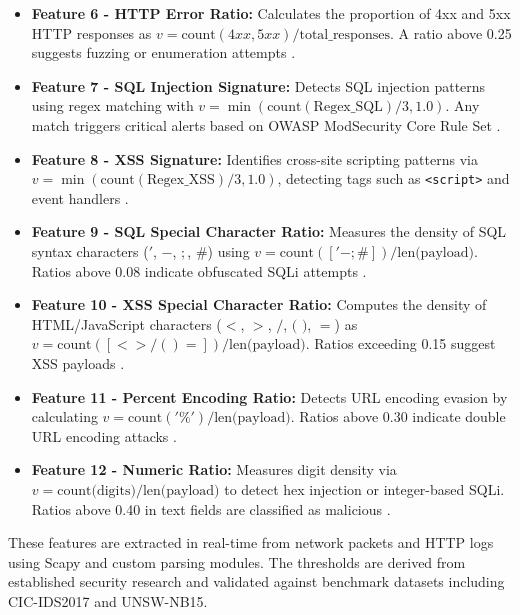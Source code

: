 \documentclass[12pt,a4paper]{report}
\begin{document}
\begin{itemize}
    \item \textbf{Feature 6 - HTTP Error Ratio:} Calculates the proportion of 4xx and 5xx HTTP responses as $v = \text{count}(4xx, 5xx) / \text{total\_responses}$. A ratio above 0.25 suggests fuzzing or enumeration attempts \cite{owaspAppSensor}.
    
    \item \textbf{Feature 7 - SQL Injection Signature:} Detects SQL injection patterns using regex matching with $v = \min(\text{count}(\text{Regex\_SQL}) / 3, 1.0)$. Any match triggers critical alerts based on OWASP ModSecurity Core Rule Set \cite{owaspModSecCRS}.
    
    \item \textbf{Feature 8 - XSS Signature:} Identifies cross-site scripting patterns via $v = \min(\text{count}(\text{Regex\_XSS}) / 3, 1.0)$, detecting tags such as \texttt{<script>} and event handlers \cite{owaspModSecCRS}.
    
    \item \textbf{Feature 9 - SQL Special Character Ratio:} Measures the density of SQL syntax characters ($'$, $-$, $;$, $\#$) using $v = \text{count}([' - ; \#]) / \text{len(payload)}$. Ratios above 0.08 indicate obfuscated SQLi attempts \cite{kruegelVigna2003}.
    
    \item \textbf{Feature 10 - XSS Special Character Ratio:} Computes the density of HTML/JavaScript characters ($<$, $>$, $/$, $($ $)$, $=$) as $v = \text{count}([< > / ( ) =]) / \text{len(payload)}$. Ratios exceeding 0.15 suggest XSS payloads \cite{kruegelVigna2003}.
    
    \item \textbf{Feature 11 - Percent Encoding Ratio:} Detects URL encoding evasion by calculating $v = \text{count}('\%') / \text{len(payload)}$. Ratios above 0.30 indicate double URL encoding attacks \cite{rfc3986}.
    
    \item \textbf{Feature 12 - Numeric Ratio:} Measures digit density via $v = \text{count(digits)} / \text{len(payload)}$ to detect hex injection or integer-based SQLi. Ratios above 0.40 in text fields are classified as malicious \cite{kozik2015}.
\end{itemize}

These features are extracted in real-time from network packets and HTTP logs using Scapy and custom parsing modules. The thresholds are derived from established security research and validated against benchmark datasets including CIC-IDS2017 and UNSW-NB15.
\end{document}
